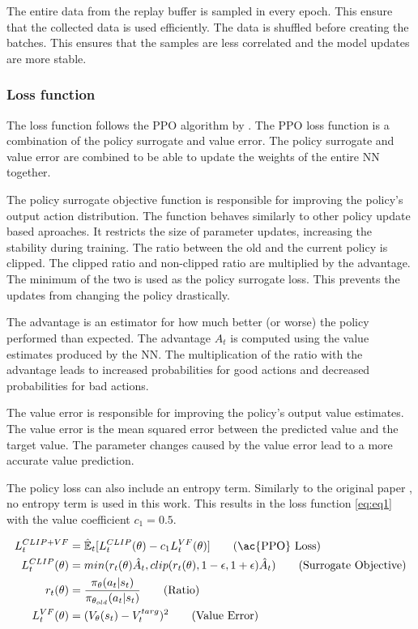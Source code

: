 The entire data from the replay buffer is sampled in every epoch. This ensure that the collected data is used efficiently. The data is shuffled before creating the batches. This ensures that the samples are less correlated and the model updates are more stable.

\subsubsection*{Loss function}

The loss function follows the \ac{PPO} algorithm by \textcite{ppo}. The \ac{PPO} loss function is a combination of the policy surrogate and value error. The policy surrogate and value error are combined to be able to update the weights of the entire \ac{NN} together.

The policy surrogate objective function is responsible for improving the policy's output action distribution. The function behaves similarly to other policy update based aproaches. It restricts the size of parameter updates, increasing the stability during training. The ratio between the old and the current policy is clipped. The clipped ratio and non-clipped ratio are multiplied by the advantage. The minimum of the two is used as the policy surrogate loss. This prevents the updates from changing the policy drastically.

The advantage is an estimator for how much better (or worse) the policy performed than expected. The advantage $\hat{A}_t$ is computed using the value estimates produced by the \ac{NN}. The multiplication of the ratio with the advantage leads to increased probabilities for good actions and decreased probabilities for bad actions.

The value error is responsible for improving the policy's output value estimates. The value error is the mean squared error between the predicted value and the target value. The parameter changes caused by the value error lead to a more accurate value prediction.

The policy loss can also include an entropy term. Similarly to the original paper \textcite{ppo}, no entropy term is used in this work. This results in the loss function \eqref{eq:eq1} with the value coefficient $c_1 = 0.5$.

\begin{align*}
    L_t^{CLIP + VF} &= \hat{\mathbb{E}}_t [L_t^{CLIP}(\theta) - c_1 L_t^{VF}(\theta)] \label{eq:eq1}\tag{\ac{PPO} Loss} \\
    L_t^{CLIP}(\theta) &= min(r_t(\theta)\hat{A}_t, clip(r_t(\theta), 1-\epsilon, 1+\epsilon)\hat{A}_t) \label{eq:eq2}\tag{Surrogate Objective}\\
    r_t(\theta) &= \frac{\pi_\theta(a_t|s_t)}{\pi_{\theta_{old}}(a_t|s_t)} \label{eq:eq3}\tag{Ratio}\\
    L_t^{VF}(\theta) &= (V_\theta (s_t) - V_t^{targ})^2 \label{eq:eq4}\tag{Value Error}
\end{align*}

